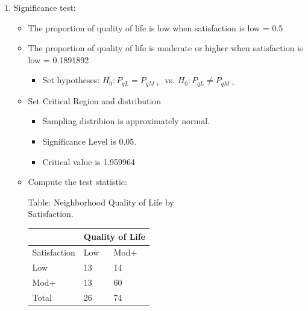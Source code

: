 \documentclass[11pt, chapterprefix=true]{scrbook}\usepackage[]{graphicx}\usepackage[]{color}
\begin{document}
\begin{exercises}
\begin{exercise}
  \end{exercise}
  \vspace{2mm}
  \begin{solution}

  \begin{enumerate}
	 \item Significance test:



\begin{itemize}

\item The proportion of quality of life is low when satisfaction is low = 0.5
\item The proportion of quality of life is moderate or higher when satisfaction is low = 0.1891892
  \begin{itemize}
  \item Set hypotheses: $H_0: P_{qL} = P_{qM+}$ vs. $H_0: P_{qL} \ne P_{qM+}$
  \end{itemize}

\item Set Critical Region and distribution

  \begin{itemize}
  \item Sampling distribion is approximately normal.
  \item Significance Level is 0.05.
  \item Critical value is 1.959964
  \end{itemize}

\item Compute the test statistic:

\begin{minipage}[ht]{6cm}

Table: Neighborhood Quality of Life by \\ Satisfaction.

      \begin{tabular}{@{} p{2.5cm} p{1cm} p{1cm} @{}} \hline %
     &  \multicolumn{2}{c}{ Quality of Life } \\ \hline
     Satisfaction   & Low & Mod+ \\ \hline
     Low           & 13 & 14 \\
     Mod+          & 13 & 60 \\ \hline
     Total         & 26 & 74 \\ \hline
   \end{tabular}


\end{minipage}
\end{itemize}
\end{enumerate}
\end{solution}
\end{exercises}
\end{document}
